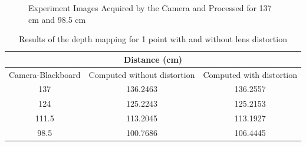 \begin{figure}[!h]
{  \label{fig:exp1Point98dot5}
}
\quad 
{}
\caption{Experiment Images Acquired by the Camera and Processed for 137 cm and 98.5 cm} 
\end{figure}

\begin{table}[h]
\centering
\caption{Results of the depth mapping for 1 point with and without lens distortion}
\label{results1Point}
\renewcommand{\arraystretch}{1.5}
\begin{tabular}{|c|c|c|}
\hline
\multicolumn{3}{|c|}{Distance (cm)} \\ \hline
Camera-Blackboard & Computed without distortion & Computed with distortion \\ \hline
137 & 136.2463 & 136.2557 \\ \hline
124 & 125.2243 & 125.2153 \\ \hline
111.5 & 113.2045 & 113.1927 \\ \hline
98.5 & 100.7686 & 106.4445 \\ \hline
\end{tabular}
\end{table}

